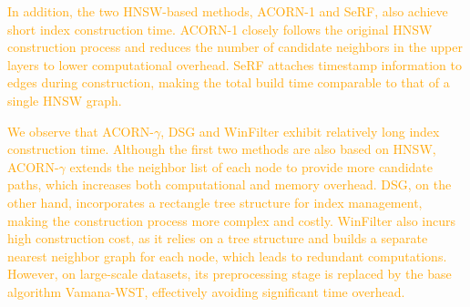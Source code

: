 \documentclass[sigconf, nonacm]{acmart}
\begin{document}
{\textcolor{orange}{In addition, the two HNSW-based methods, ACORN-1 and SeRF, also achieve short index construction time. ACORN-1 closely follows the original HNSW construction process and reduces the number of candidate neighbors in the upper layers to lower computational overhead. SeRF attaches timestamp information to edges during construction, making the total build time comparable to that of a single HNSW graph.
	}

\textcolor{orange}{We observe that ACORN-\(\gamma\), DSG and WinFilter exhibit relatively long index construction time. Although the first two methods are also based on HNSW, ACORN-\(\gamma\) extends the neighbor list of each node to provide more candidate paths, which increases both computational and memory overhead. DSG, on the other hand, incorporates a rectangle tree structure for index management, making the construction process more complex and costly. 
WinFilter also incurs high construction cost, as it relies on a tree structure and builds a separate nearest neighbor graph for each node, which leads to redundant computations. However, on large-scale datasets, its preprocessing stage is replaced by the base algorithm Vamana-WST, effectively avoiding significant time overhead.}
%	
	
}
\end{document}
